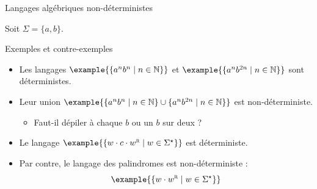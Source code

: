
\begingroup

\begin{frame}{Langages algébriques non-déterministes}
  
  Soit $\Sigma = \{a, b\}$.
  
  \begin{exampleblock}{Exemples et contre-exemples}
    \begin{itemize}
    \item Les langages $\example{\{ a^n b^n \mid n\in \mathbb{N}\}}$ et $\example{\{ a^n b^{2n} \mid n\in \mathbb{N}\}}$ sont déterministes.
    \item\vspace{2mm} Leur union $\example{\{ a^n b^n \mid n\in \mathbb{N}\} \cup \{ a^n b^{2n} \mid n\in \mathbb{N}\}}$ est non-déterministe.
      \begin{itemize}
      \item Faut-il dépiler à chaque $b$ ou un $b$ sur deux ? 
      \end{itemize}
    \item\vspace{2mm} Le langage $\example{\{ w \cdot c \cdot w^{\textsc{r}} \mid w\in \Sigma^\star\}}$ est déterministe.
      \begin{center}
      \end{center}
    \item\vspace{2mm} Par contre, le langage des palindromes est non-déterministe :
      $$\example{\{ w \cdot w^{\textsc{r}} \mid w\in \Sigma^\star\}}$$
    \end{itemize}
  \end{exampleblock}

\end{frame}

\endgroup
\endinput
